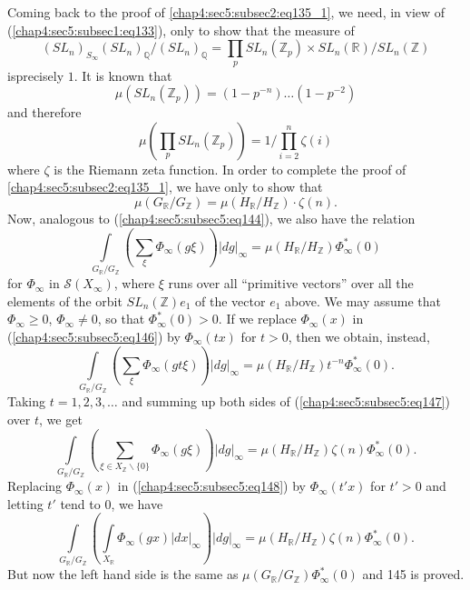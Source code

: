 Coming back to the proof of \ref{chap4:sec5:subsec2:eq135_1}, we
need, in view of (\ref{chap4:sec5:subsec1:eq133}), 
only to show that the measure of
$$
(SL_{n})_{S_{\infty}}(SL_{n})_{\mathbb{Q}}/(SL_{n})_{\mathbb{Q}}=\prod_{p}SL_{n}(\mathbb{Z}_{p})\times
SL_{n}(\mathbb{R})/SL_{n}(\mathbb{Z}) 
$$
is\pageoriginale precisely $1$. It is known that
$$
\mu(SL_{n}(\mathbb{Z}_{p}))=(1-p^{-n})\ldots (1-p^{-2})
$$
and therefore
$$
\mu\left(\prod_{p}SL_{n}(\mathbb{Z}_{p})\right)=1/\prod^{n}_{i=2}\zeta (i)
$$
where $\zeta$ is the Riemann zeta function. In order to complete the
proof of \ref{chap4:sec5:subsec2:eq135_1}, we have only to show that
\begin{equation*}
  \mu(G_{\mathbb{R}}/G_{\mathbb{Z}})=\mu(H_{\mathbb{R}}/H_{\mathbb{Z}})
  \cdot\zeta(n).\tag{145}\label{chap4:sec5:subsec5:eq145} 
\end{equation*}
Now, analogous to (\ref{chap4:sec5:subsec5:eq144}), we also have the
relation 
\begin{equation*}
  \int\limits_{G_{\mathbb{R}}/G_{\mathbb{Z}}}\left(\sum_{\xi}
  \Phi_{\infty}(g\xi)\right)|dg|_{\infty}=\mu(H_{\mathbb{R}}/
  H_{\mathbb{Z}})\Phi^{\ast}_{\infty}(0)
  \tag{146}\label{chap4:sec5:subsec5:eq146}
\end{equation*}
for $\Phi_{\infty}$ in $\mathscr{S}(X_{\infty})$, where $\xi$ runs over
all ``primitive vectors'' \ie over all the elements of the orbit
$SL_{n}(\mathbb{Z})e_{1}$ of the vector $e_{1}$ above. We may assume
that $\Phi_{\infty}\geq 0$, $\Phi_{\infty}\neq 0$, so that
$\Phi^{\ast}_{\infty}(0)>0$. If we replace $\Phi_{\infty}(x)$ in
(\ref{chap4:sec5:subsec5:eq146}) by $\Phi_{\infty}(tx)$ for $t>0$,
then we obtain, instead, 
\begin{equation*}
  \int\limits_{G_{\mathbb{R}}/G_{\mathbb{Z}}}\left(\sum_{\xi}\Phi_{\infty}(gt\xi)
  \right)|dg|_{\infty}=\mu(H_{\mathbb{R}}/H_{\mathbb{Z}})t^{-n}
  \Phi^{\ast}_{\infty}(0).\tag{147}\label{chap4:sec5:subsec5:eq147} 
\end{equation*}
Taking $t=1,2,3,\ldots$ and summing up both sides of
(\ref{chap4:sec5:subsec5:eq147}) over $t$, we get
\begin{equation*}
  \int\limits_{G_{\mathbb{R}}/G_{\mathbb{Z}}}\left(\sum_{\xi\in
    X_{\mathbb{Z}}
    \backslash\{0\}}\Phi_{\infty}(g\xi)\right)|dg|_{\infty}=\mu
  (H_{\mathbb{R}}/H_{\mathbb{Z}})\zeta(n)\Phi^{\ast}_{\infty}(0).
  \tag{148}\label{chap4:sec5:subsec5:eq148}
\end{equation*}
Replacing $\Phi_{\infty}(x)$ in (\ref{chap4:sec5:subsec5:eq148}) by
$\Phi_{\infty}(t'x)$ for 
$t'>0$ and letting $t'$ tend to $0$, we have 
$$
\int\limits_{G_{\mathbb{R}}/G_{\mathbb{Z}}}\left(\int\limits_{X_{\mathbb{R}}}\Phi_{\infty}(gx)|dx|_{\infty}\right)|dg|_{\infty}=\mu(H_{\mathbb{R}}/H_{\mathbb{Z}})\zeta(n)\Phi^{\ast}_{\infty}(0).
$$\pageoriginale 
But now the left hand side is the same as
$\mu(G_{\mathbb{R}}/G_{\mathbb{Z}})\Phi^{\ast}_{\infty}(0)$ and
{145} is proved.

